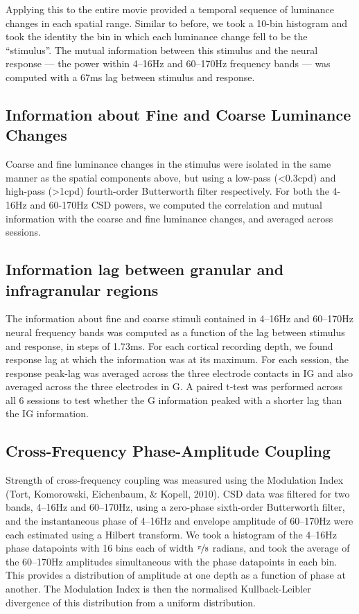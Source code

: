 Applying this to the entire movie provided a temporal sequence of luminance changes in each spatial range.
Similar to before, we took a 10-bin histogram and took the identity the bin in which each luminance change fell to be the ``stimulus''.
The mutual information between this stimulus and the neural response --- the power within 4--16Hz and 60--170Hz frequency bands --- was computed with a 67ms lag between stimulus and response.

\subsection{Information about Fine and Coarse Luminance Changes}
Coarse and fine luminance changes in the stimulus were isolated in the same manner as the spatial components above, but using a low-pass ({\textless}0.3cpd) and high-pass ({\textgreater}1cpd) fourth-order Butterworth filter respectively.
For both the 4-16Hz and 60-170Hz \ac{CSD} powers, we computed the correlation and mutual information with the coarse and fine luminance changes, and averaged across sessions.

\subsection[Information lag between granular and infragranular regions]{Information lag between granular and infragranular regions}
The information about fine and coarse stimuli contained in 4--16Hz and 60--170Hz neural frequency bands was computed as a function of the lag between stimulus and response, in steps of 1.73ms.
For each cortical recording depth, we found response lag at which the information was at its maximum.
For each session, the response peak-lag was averaged across the three electrode contacts in \ac{IG} and also averaged across the three electrodes in \ac{G}.
A paired t-test was performed across all 6 sessions to test whether the \ac{G} information peaked with a shorter lag than the \ac{IG} information.

\subsection{Cross-Frequency Phase-Amplitude Coupling}
Strength of cross-frequency coupling was measured using the Modulation Index (Tort, Komorowski, Eichenbaum, \& Kopell, 2010).
\ac{CSD} data was filtered for two bands, 4--16Hz and 60--170Hz, using a zero-phase sixth-order Butterworth filter, and the instantaneous phase of 4--16Hz and envelope amplitude of 60--170Hz were each estimated using a Hilbert transform.
We took a histogram of the 4--16Hz phase datapoints with 16 bins each of width $\nicefrac{\pi}{8}$ radians, and took the average of the 60--170Hz amplitudes simultaneous with the phase datapoints in each bin.
This provides a distribution of amplitude at one depth as a function of phase at another.
The Modulation Index is then the normalised Kullback-Leibler divergence of this distribution from a uniform distribution.

